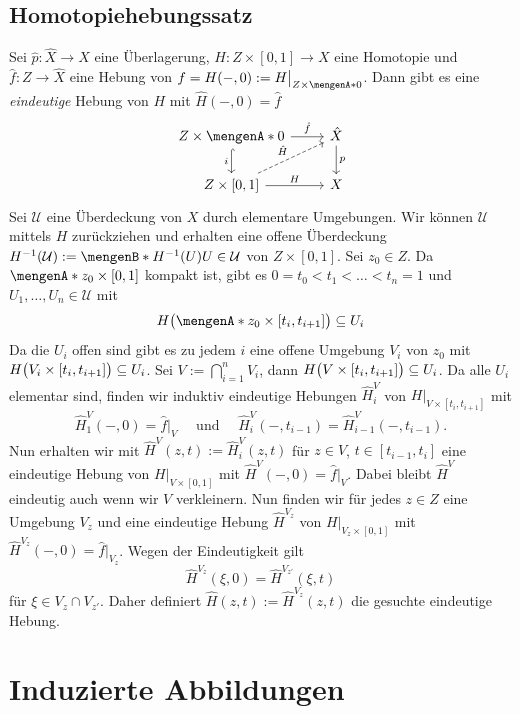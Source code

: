 \subsection{Homotopiehebungssatz} %
\label{sub:108}
Sei $\hat{p} : \hat{X} \to X$ eine Überlagerung, $H : Z \times [0,1] \to X$ eine Homotopie und $\hat{f} : Z \to \hat{X}$ eine Hebung von 
$f = H(-,0) := H\big|_{Z \times \set{0}}$. Dann gibt es eine \emph{eindeutige} Hebung von $H$ mit $\hat{H}(-,0)= \hat{f}$
\[
	\begin{tikzcd}
		Z \times \set{0} \dar[hook, swap]{i} \rar{\hat{f}}& \hat{X} \dar{p} \\
		Z \times [0,1] \urar[dashed]{\hat{H}} \rar{H}& X  
	\end{tikzcd}
\]
Sei $\mathcal{U}$ eine Überdeckung von $X$ durch elementare Umgebungen. Wir können $\mathcal{U}$ mittels $H$ zurückziehen und erhalten eine offene Überdeckung
$H ^{-1}(\mathcal{U}) := \set[H ^{-1}(U)]{U \in \mathcal{U}}$ von $Z \times [0,1]$. Sei $z_0 \in Z$. Da $\set{z_0} \times [0,1]$ kompakt ist, gibt es 
$0 = t_0 < t_1 < \ldots < t_n=1$ und $U_1, \ldots , U_n \in \mathcal{U}$ mit 
\[
	H \enbrace[\big]{\set{z_0} \times [t_i, t_{i+1}] } \subseteq U_i 
\]
Da die $U_i$ offen sind gibt es zu jedem $i$ eine offene Umgebung $V_i$ von $z_0$ mit $H\enbrace[\big]{V_i \times[t_i, t_{i+1}]} \subseteq U_i$. Sei 
$V := \bigcap_{i=1}^n V_i$, dann $H \enbrace[\big]{V \times [t_i, t_{i+1}]} \subseteq U_i$. Da alle $U_i$ elementar sind, finden wir induktiv eindeutige Hebungen
$\hat{H}_i^V$ von $H\big|_{V \times [t_i, t_{i+1}]}$ mit 
\[
	\hat{H}_1^V(-,0)= \hat{f}\big|_{V}\quad \text{ und } \quad \hat{H}_i^V(-,t_{i-1}) = \hat{H}_{i-1}^V (-, t_{i-1}).
\]
Nun erhalten wir mit $\hat{H}^V(z,t) := \hat{H}_i^V(z,t)$ für $z \in V$, $t \in [t_{i-1},t_i]$ eine eindeutige Hebung von $H\big|_{V \times [0,1]}$ mit 
$\hat{H}^V(-,0) = \hat{f}\big|_V$. Dabei bleibt $\hat{H}^V$ eindeutig auch wenn wir $V$ verkleinern. Nun finden wir für jedes $z \in Z$ eine Umgebung $V_z$ und eine 
eindeutige Hebung $\hat{H}^{V_z}$ von $H\big|_{V_z \times [0,1]}$ mit 
\(
	\hat{H}^{V_z} (-,0) = \hat{f}\big|_{V_z}
\).
Wegen der Eindeutigkeit gilt 
\[
	\hat{H}^{V_z} (\xi,0) = \hat{H}^{V_{z'}}(\xi,t)
\]
für $\xi \in V_z \cap V_{z'}$. Daher definiert $\hat{H}(z,t) := \hat{H}^{V_z}(z,t)$ die gesuchte eindeutige Hebung. \bewende
\newpage

\section{Induzierte Abbildungen} %
\label{sec:11}
